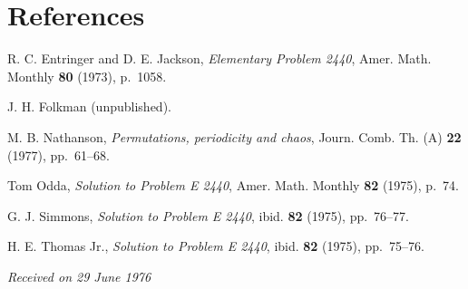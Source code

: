 \documentclass[10pt]{article}
\begin{document}
\section*{References}
\begin{enumerate}[label={[\arabic*]},leftmargin=2.6em,itemsep=0pt]
\item R. C. Entringer and D. E. Jackson, \emph{Elementary Problem 2440},
Amer. Math. Monthly \textbf{80} (1973), p.~1058.
\item J. H. Folkman (unpublished).
\item M. B. Nathanson, \emph{Permutations, periodicity and chaos},
Journ. Comb. Th. (A) \textbf{22} (1977), pp.~61--68.
\item Tom Odda, \emph{Solution to Problem E 2440}, Amer. Math. Monthly
\textbf{82} (1975), p.~74.
\item G. J. Simmons, \emph{Solution to Problem E 2440}, ibid.
\textbf{82} (1975), pp.~76--77.
\item H. E. Thomas Jr., \emph{Solution to Problem E 2440}, ibid.
\textbf{82} (1975), pp.~75--76.
\end{enumerate}

\bigskip
\begin{center}
\emph{Received on 29 June 1976}
\end{center}
\end{document}
